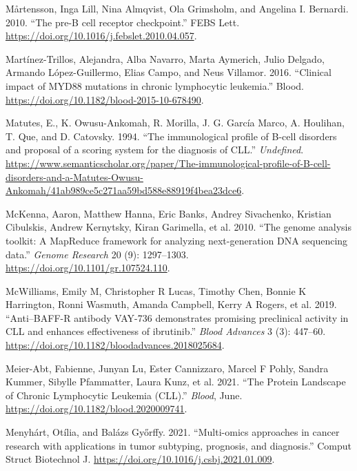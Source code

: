\documentclass[11pt, a4paper, twosided]{book}
\newenvironment{CSLReferences}%
  {}%
  {\par}
\begin{document}
\begin{CSLReferences}{1}{0}
\leavevmode{}%
Mårtensson, Inga Lill, Nina Almqvist, Ola Grimsholm, and Angelina I. Bernardi. 2010. {``{The pre-B cell receptor checkpoint}.''} FEBS Lett. \url{https://doi.org/10.1016/j.febslet.2010.04.057}.

\leavevmode{}%
Martínez-Trillos, Alejandra, Alba Navarro, Marta Aymerich, Julio Delgado, Armando López-Guillermo, Elias Campo, and Neus Villamor. 2016. {``{Clinical impact of MYD88 mutations in chronic lymphocytic leukemia}.''} Blood. \url{https://doi.org/10.1182/blood-2015-10-678490}.

\leavevmode{}%
Matutes, E., K. Owusu-Ankomah, R. Morilla, J. G. García Marco, A. Houlihan, T. Que, and D. Catovsky. 1994. {``{The immunological profile of B-cell disorders and proposal of a scoring system for the diagnosis of CLL.}''} \emph{Undefined}. \url{https://www.semanticscholar.org/paper/The-immunological-profile-of-B-cell-disorders-and-a-Matutes-Owusu-Ankomah/41ab989ce5c271aa59bd588e88919f4bea23dce6}.

\leavevmode{}%
McKenna, Aaron, Matthew Hanna, Eric Banks, Andrey Sivachenko, Kristian Cibulskis, Andrew Kernytsky, Kiran Garimella, et al. 2010. {``{The genome analysis toolkit: A MapReduce framework for analyzing next-generation DNA sequencing data}.''} \emph{Genome Research} 20 (9): 1297--1303. \url{https://doi.org/10.1101/gr.107524.110}.

\leavevmode{}%
McWilliams, Emily M, Christopher R Lucas, Timothy Chen, Bonnie K Harrington, Ronni Wasmuth, Amanda Campbell, Kerry A Rogers, et al. 2019. {``{Anti--BAFF-R antibody VAY-736 demonstrates promising preclinical activity in CLL and enhances effectiveness of ibrutinib}.''} \emph{Blood Advances} 3 (3): 447--60. \url{https://doi.org/10.1182/bloodadvances.2018025684}.

\leavevmode{}%
Meier-Abt, Fabienne, Junyan Lu, Ester Cannizzaro, Marcel F Pohly, Sandra Kummer, Sibylle Pfammatter, Laura Kunz, et al. 2021. {``{The Protein Landscape of Chronic Lymphocytic Leukemia (CLL).}''} \emph{Blood}, June. \url{https://doi.org/10.1182/blood.2020009741}.

\leavevmode{}%
Menyhárt, Otília, and Balázs Győrffy. 2021. {``{Multi-omics approaches in cancer research with applications in tumor subtyping, prognosis, and diagnosis}.''} Comput Struct Biotechnol J. \url{https://doi.org/10.1016/j.csbj.2021.01.009}.


\end{CSLReferences}
\end{document}
